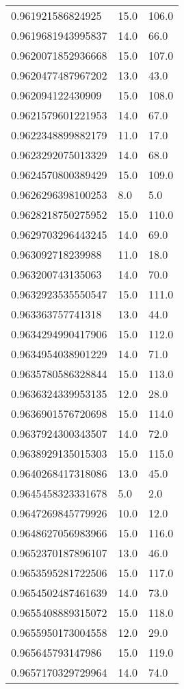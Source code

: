 \begin{center}
\begin{supertabular}[H]{p{0.30\textwidth}p{0.05\textwidth}p{0.05\textwidth}}
0.961921586824925 & 15.0 & 106.0 \\ 
0.9619681943995837 & 14.0 & 66.0 \\ 
0.9620071852936668 & 15.0 & 107.0 \\ 
0.9620477487967202 & 13.0 & 43.0 \\ 
0.962094122430909 & 15.0 & 108.0 \\ 
0.9621579601221953 & 14.0 & 67.0 \\ 
0.9622348899882179 & 11.0 & 17.0 \\ 
0.9623292075013329 & 14.0 & 68.0 \\ 
0.9624570800389429 & 15.0 & 109.0 \\ 
0.9626296398100253 & 8.0 & 5.0 \\ 
0.9628218750275952 & 15.0 & 110.0 \\ 
0.9629703296443245 & 14.0 & 69.0 \\ 
0.963092718239988 & 11.0 & 18.0 \\ 
0.963200743135063 & 14.0 & 70.0 \\ 
0.9632923535550547 & 15.0 & 111.0 \\ 
0.963363757741318 & 13.0 & 44.0 \\ 
0.9634294990417906 & 15.0 & 112.0 \\ 
0.9634954038901229 & 14.0 & 71.0 \\ 
0.9635780586328844 & 15.0 & 113.0 \\ 
0.9636324339953135 & 12.0 & 28.0 \\ 
0.9636901576720698 & 15.0 & 114.0 \\ 
0.9637924300343507 & 14.0 & 72.0 \\ 
0.9638929135015303 & 15.0 & 115.0 \\ 
0.9640268417318086 & 13.0 & 45.0 \\ 
0.9645458323331678 & 5.0 & 2.0 \\ 
0.9647269845779926 & 10.0 & 12.0 \\ 
0.9648627056983966 & 15.0 & 116.0 \\ 
0.9652370187896107 & 13.0 & 46.0 \\ 
0.9653595281722506 & 15.0 & 117.0 \\ 
0.9654502487461639 & 14.0 & 73.0 \\ 
0.9655408889315072 & 15.0 & 118.0 \\ 
0.9655950173004558 & 12.0 & 29.0 \\ 
0.965645793147986 & 15.0 & 119.0 \\ 
0.9657170329729964 & 14.0 & 74.0 \\ 

\end{supertabular}
\end{center}
